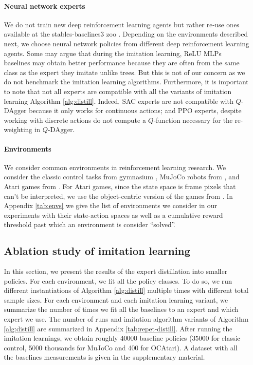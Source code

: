\paragraph{Neural network experts}
We do not train new deep reinforcement learning agents \cite{dqn,ppo,deep-rl-relu1} but rather re-use ones available at the stables-baselines3 zoo \cite{zoo}. Depending on the environments described next, we choose neural network policies from different deep reinforcement learning agents. Some may argue that during the imitation learning, ReLU MLPs baselines may obtain better performance because they are often from the same class as the expert they imitate unlike trees. But this is not of our concern as we do not benchmark the imitation learning algorithms. Furthermore, it is important to note that not all experts are compatible with all the variants of imitation learning Algorithm \ref{alg:distill}. Indeed, SAC experts \cite{deep-rl-relu1} are not compatible with $Q$-DAgger \cite{viper} because it only works for continuous actions; and PPO experts, despite working with discrete actions do not compute a $Q$-function necessary for the re-weighting in $Q$-DAgger.

\paragraph{Environments}
We consider common environments in reinforcement learning research. We consider the classic control tasks from gymnasium \cite{gymnasium}, MuJoCo robots from \cite{mujoco}, and Atari games from \cite{atari}. For Atari games, since the state space is frame pixels that can't be interpreted, we use the object-centric version of the games from \cite{ocatari}. In Appendix \ref{tab:envs} we give the list of environments we consider in our experiments with their state-action spaces as well as a cumulative reward threshold past which an environment is consider ``solved''.

\subsection{Ablation study of imitation learning}\label{sec:res-imit}

In this section, we present the results of the expert distillation into smaller policies. For each environment, we fit all the policy classes. To do so, we run different instantiations of Algorithm \ref{alg:distill} multiple times with different total sample sizes. For each environment and each imitation learning variant, we summarize the number of times we fit all the baselines to an expert and which expert we use. The number of runs and imitation algorithm variants of Algorithm \ref{alg:distill} are summarized in Appendix \ref{tab:repet-distill}. After running the imitation learnings, we obtain roughly 40000 baseline policies (35000 for classic control, 5000 thousands for MuJoCo and 400 for OCAtari). A dataset with all the baselines measurements is given in the supplementary material.

